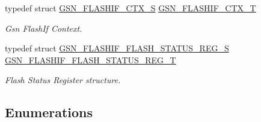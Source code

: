 \begin{DoxyCompactItemize}
typedef struct \hyperlink{a00079}{GSN\_\-FLASHIF\_\-CTX\_\-S} \hyperlink{a00647_gacef88670392e2c2c8f6cc45eab1ad658}{GSN\_\-FLASHIF\_\-CTX\_\-T}
\begin{DoxyCompactList}\small\item\em Gsn FlashIf Context. \end{DoxyCompactList}\item 
typedef struct \hyperlink{a00081}{GSN\_\-FLASHIF\_\-FLASH\_\-STATUS\_\-REG\_\-S} \hyperlink{a00647_ga817ad96ff2f6956f431999227f67c3ca}{GSN\_\-FLASHIF\_\-FLASH\_\-STATUS\_\-REG\_\-T}
\begin{DoxyCompactList}\small\item\em Flash Status Register structure. \end{DoxyCompactList}\end{DoxyCompactItemize}
\subsection*{Enumerations}
